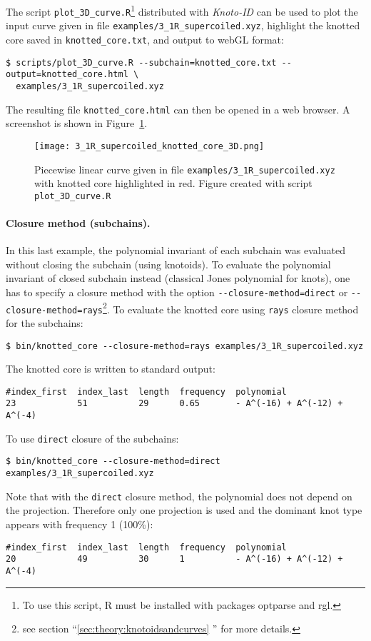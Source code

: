 The script \lstinline{plot_3D_curve.R}\footnote{To use this script, {\ttfamily R}\cite{r2017} must be installed with packages {\ttfamily optparse}\cite{optparse} and {\ttfamily rgl}\cite{rgl}.} distributed with {\it Knoto-ID} can be used to plot the input curve given in file \lstinline{examples/3_1R_supercoiled.xyz}, highlight the knotted core saved in \lstinline{knotted_core.txt}, and output to webGL format\cite{webgl}:
\begin{lstlisting}
$ scripts/plot_3D_curve.R --subchain=knotted_core.txt --output=knotted_core.html \
  examples/3_1R_supercoiled.xyz
\end{lstlisting}
The resulting file \lstinline{knotted_core.html} can then be opened in a web browser. A screenshot is shown in Figure~\ref{fig:3_1R_supercoiled:knottedcore:3D}.
\begin{figure}[t]
\centering
\texttt{[image: 3\_1R\_supercoiled\_knotted\_core\_3D.png]}
\caption{Piecewise linear curve given in file \lstinline{examples/3_1R_supercoiled.xyz} with knotted core highlighted in red. Figure created with script \lstinline{plot_3D_curve.R}}\label{fig:3_1R_supercoiled:knottedcore:3D}
\end{figure}



\paragraph{Closure method (subchains).}
In this last example, the polynomial invariant of each subchain was evaluated without closing the subchain (using knotoids). To evaluate the polynomial invariant of closed subchain instead (classical Jones polynomial for knots), one has to specify a closure method with the option \lstinline{--closure-method=direct} or \lstinline{--closure-method=rays}\footnote{see section ``\ref{sec:theory:knotoidsandcurves} '' for more details.}. To evaluate the knotted core using \lstinline{rays} closure method for the subchains:
\begin{lstlisting}
$ bin/knotted_core --closure-method=rays examples/3_1R_supercoiled.xyz
\end{lstlisting}
The knotted core is written to standard output:
\begin{lstlisting}
#index_first  index_last  length  frequency  polynomial
23            51          29      0.65       - A^(-16) + A^(-12) + A^(-4)
\end{lstlisting}
To use \lstinline{direct} closure of the subchains:
\begin{lstlisting}
$ bin/knotted_core --closure-method=direct examples/3_1R_supercoiled.xyz
\end{lstlisting}
Note that with the \lstinline{direct} closure method, the polynomial does not depend on the projection. Therefore only one projection is used and the dominant knot type appears with frequency 1 (100\%):
\begin{lstlisting}
#index_first  index_last  length  frequency  polynomial
20            49          30      1          - A^(-16) + A^(-12) + A^(-4)
\end{lstlisting}

